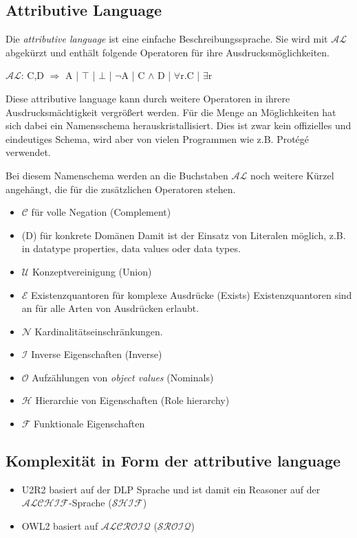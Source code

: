 \subsection{Attributive Language}
Die \emph{attributive language} ist eine einfache Beschreibungssprache. Sie wird mit $\mathcal{AL}$ abgekürzt und enthält folgende Operatoren für ihre Ausdrucksmöglichkeiten.

$\mathcal{AL}$: C,D $\Longrightarrow$ A | $\top$ | $\bot$ | $\lnot$A | C $\land$ D | $\forall$r.C | $\exists$r

Diese attributive language kann durch weitere Operatoren in ihrere Ausdrucksmächtigkeit vergrößert werden. Für die Menge an Möglichkeiten hat sich dabei ein Namensschema herauskristallisiert. Dies ist zwar kein offizielles und eindeutiges Schema, wird aber von vielen Programmen wie z.B. Protégé verwendet.

Bei diesem Namenschema werden an die Buchstaben $\mathcal{AL}$ noch weitere Kürzel angehängt, die für die zusätzlichen Operatoren stehen.
\begin{itemize}
  \item $\mathcal{C}$ für volle Negation (Complement)
  \item (D) für konkrete Domänen\newline
Damit ist der Einsatz von Literalen möglich, z.B. in datatype properties, data values oder data types.
  \item $\mathcal{U}$ Konzeptvereinigung (Union)
  \item $\mathcal{E}$ Existenzquantoren für komplexe Ausdrücke (Exists)\newline
Existenzquantoren sind an für alle Arten von Ausdrücken erlaubt.
  \item $\mathcal{N}$ Kardinalitätseinschränkungen.
  \item $\mathcal{I}$ Inverse Eigenschaften (Inverse)
  \item $\mathcal{O}$ Aufzählungen von \emph{object values} (Nominals)
  \item $\mathcal{H}$ Hierarchie von Eigenschaften (Role hierarchy)
  \item $\mathcal{F}$ Funktionale Eigenschaften
\end{itemize}
\cite{wiki:DescriptionLogic}

\subsection{Komplexität in Form der attributive language}
\begin{itemize}
  \item U2R2 basiert auf der DLP Sprache und ist damit ein Reasoner auf der $\mathcal{ALCHIF}$-Sprache ($\mathcal{SHIF}$)
  \item OWL2 basiert auf $\mathcal{ALCROIQ}$ ($\mathcal{SROIQ}$) \cite{Krötzsch2008}
\end{itemize}


